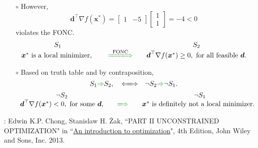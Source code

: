 \documentclass[12pt,thmsa]{article}
\begin{document}
\begin{itemize}
\begin{itemize}
		\item[\(\circ\)] However,
		\[
		\boldsymbol{d}^{\top} \nabla f(\boldsymbol{x}^*) = \begin{bmatrix} 1 & -5 \end{bmatrix} \begin{bmatrix} 1 \\ 1 \end{bmatrix} = -4 < 0
		\]
		violates the FONC.
		\[ \begin{array}{ccccc}
			S_{1} & & & & S_{2} \\
			\boldsymbol{x}^* \text{ is a local minimizer, } & & { \color{forestgreen}\xLongrightarrow{{\color{black}\text{ FONC }}} } & & \boldsymbol{d}^{\top} \nabla f(\boldsymbol{x}^*) \geq 0, \text{ for all feasible } \boldsymbol{d}.
			\end{array}
		\]
		\item[\(\circ\)] Based on truth table and by contraposition,
		\[ S_{1} {\color{forestgreen}\Rightarrow}  S_{2}, \quad \mathbf{\xLongleftrightarrow{}} \quad \neg S_{2} {\color{forestgreen}\Rightarrow} \neg S_{1}. \]
		\[ \begin{array}{ccccc}
			 	\neg S_{2} & & & & \neg S_{1} \\
			 \boldsymbol{d}^{\top} \nabla f(\boldsymbol{x}^*) < 0, \text{ for some } \boldsymbol{d}, & & {\color{forestgreen}\xLongrightarrow{}}  & & \boldsymbol{x}^* \text{  is definitely not a local minimizer. }
			\end{array}
		\]
	\end{itemize}
\end{itemize}



\bigskip

\noindent
[Ref]: Edwin K.P. Chong, Stanislaw H. Żak, ``PART II UNCONSTRAINED OPTIMIZATION" in ``\href{https://www.amazon.com/Introduction-Optimization-Edwin-K-Chong/dp/1118279018}{An introduction to optimization}", 4th Edition, John Wiley and Sons, Inc. 2013.
\end{document}
